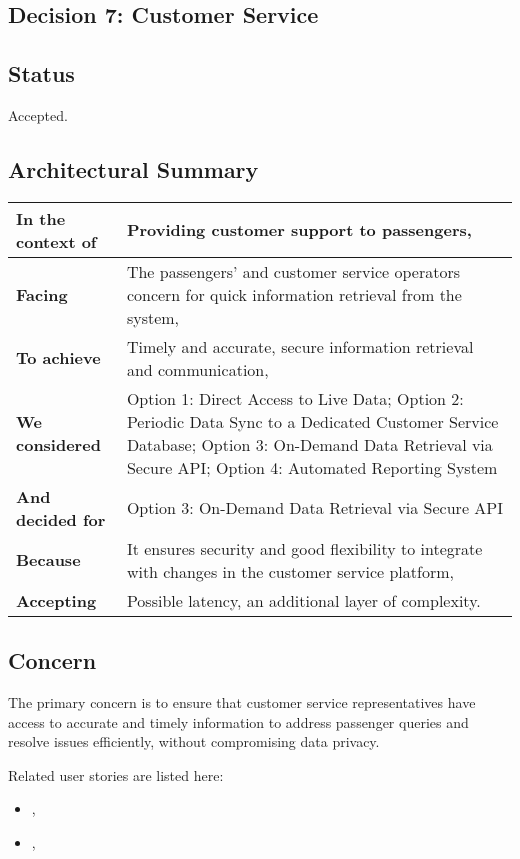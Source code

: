 \subsection{Decision 7: Customer Service}

\subsection*{Status}
Accepted.

\subsection*{Architectural Summary}
\begin{tabular}{|p{3.5cm}|p{10.5cm}|}
    \hline
    \textbf{In the context of} & Providing customer support to passengers, \\
    \hline
    \textbf{Facing} & The passengers' and customer service operators concern for quick information retrieval from the system, \\
    \hline
    \textbf{To achieve} & Timely and accurate, secure information retrieval and communication, \\
    \hline
    \textbf{We considered} & Option 1: Direct Access to Live Data; Option 2: Periodic Data Sync to a Dedicated Customer Service Database; Option 3: On-Demand Data Retrieval via Secure API; Option 4: Automated Reporting System\\
    \hline
    \textbf{And decided for} & Option 3: On-Demand Data Retrieval via Secure API \\
    \hline
    \textbf{Because} & It ensures security and good flexibility to integrate with changes in the customer service platform, \\
    \hline
    \textbf{Accepting} & Possible latency, an additional layer of complexity. \\
    \hline
\end{tabular}

\subsection*{Concern}
The primary concern is to ensure that customer service representatives have access to accurate and timely information to address passenger queries and resolve issues efficiently, without compromising data privacy.

Related user stories are listed here:
\begin{itemize}
    \item \userStoryEighteen,
    \item \userStoryTwentySix,
\end{itemize}


